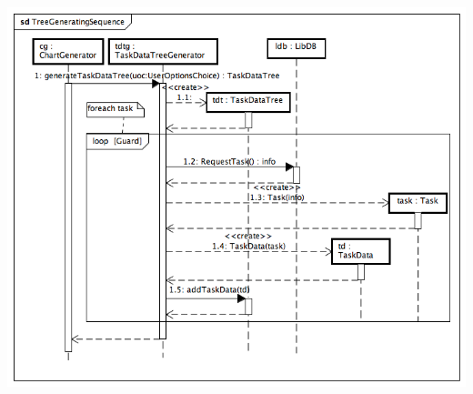 \documentclass[a4paper, 12pt]{report}
\begin{document}
\includegraphics[width=\textwidth]{chart/TreeGeneratingSequence.png}
\end{document}
